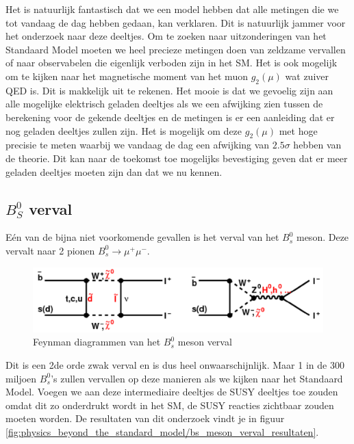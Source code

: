 \documentclass[../main.tex]{subfiles}
\begin{document}
Het is natuurlijk fantastisch dat we een model hebben dat alle metingen die we tot vandaag de dag hebben gedaan, kan verklaren. Dit is natuurlijk jammer voor het onderzoek naar deze deeltjes. Om te zoeken naar uitzonderingen van het Standaard Model moeten we heel precieze metingen doen van zeldzame vervallen of naar observabelen die eigenlijk verboden zijn in het SM. Het is ook mogelijk om te kijken naar het magnetische moment van het muon $g_2(\mu)$ wat zuiver QED is. Dit is makkelijk uit te rekenen. Het mooie is dat we gevoelig zijn aan alle mogelijke elektrisch geladen deeltjes als we een afwijking zien tussen de berekening voor de gekende deeltjes en de metingen is er een aanleiding dat er nog geladen deeltjes zullen zijn. Het is mogelijk om deze $g_2(\mu)$ met hoge precisie te meten waarbij we vandaag de dag een afwijking van $2.5\sigma$ hebben van de theorie. Dit kan naar de toekomst toe mogelijks bevestiging geven dat er meer geladen deeltjes moeten zijn dan dat we nu kennen.

\subsection{$B_S^0$ verval}%
\label{sub:_b_s_0_verval}

Eén van de bijna niet voorkomende gevallen is het verval van het $B_s^0$ meson. Deze vervalt naar 2 pionen $B_{s}^{0} \rightarrow \mu^{+} \mu^{-}$.

\begin{figure}[h]
    \centering
    \includegraphics[width=0.7\linewidth]{physics_beyond_the_standard_model/bs_meson_verval.png}
    \caption{Feynman diagrammen van het $B_s^0$ meson verval}%
    \label{fig:physics_beyond_the_standard_model/bs_meson_verval}
\end{figure}

Dit is een 2de orde zwak verval en is dus heel onwaarschijnlijk. Maar 1 in de 300 miljoen $B_s^0$'s zullen vervallen op deze manieren als we kijken naar het Standaard Model. Voegen we aan deze intermediaire deeltjes de SUSY deeltjes toe zouden omdat dit zo onderdrukt wordt in het SM, de SUSY reacties zichtbaar zouden moeten worden. De resultaten van dit onderzoek vindt je in figuur \ref{fig:physics_beyond_the_standard_model/bs_meson_verval_resultaten}.
\end{document}
